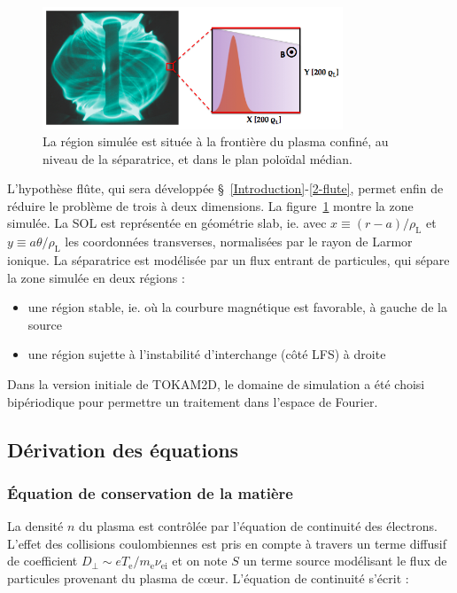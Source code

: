\begin{refsection}
\begin{figure}[!htbp]
\centering
    \includegraphics[width=0.8\textwidth]{figures/2-tokamSimDomain.png}
    \caption{La région simulée est située à la frontière du plasma confiné,
    au niveau de la séparatrice, et dans le plan poloïdal médian.}
    \label{2-figTokamGeom}
\end{figure}

L'hypothèse flûte, qui sera développée \S~\ref{Introduction}-\ref{2-flute},
permet enfin de réduire le problème de trois à deux dimensions.
La figure~\ref{2-figTokamGeom} montre la zone simulée. La SOL est représentée
en géométrie slab, ie. avec $x\equiv(r-a)/\rho_\text{L}$ et $y\equiv
a\theta/\rho_\text{L}$ les coordonnées transverses, normalisées par le rayon
de Larmor ionique. La séparatrice est modélisée par un flux entrant de particules,
qui sépare la zone simulée en deux régions :

\begin{itemize}
  \item une région stable, ie. où la courbure magnétique est favorable, à gauche
  de la source
  \item une région sujette à l'instabilité d'interchange (côté LFS) à droite
 \end{itemize}
 
Dans la version initiale de TOKAM2D, le domaine de simulation a été choisi
bipériodique pour permettre un traitement dans l'espace
de Fourier.

\subsection{Dérivation des équations}
\subsubsection{Équation de conservation de la matière}
La densité $n$ du plasma est contrôlée par l'équation de continuité des
électrons. L'effet des collisions coulombiennes est pris en compte à travers un
terme diffusif de coefficient $D_\perp\sim eT_\text{e}/m_\text{e}\nu_\text{ei}$
et on note $S$ un terme source modélisant le flux de particules
provenant du plasma de c\oe{}ur. L'équation de continuité s'écrit :


\end{refsection}
